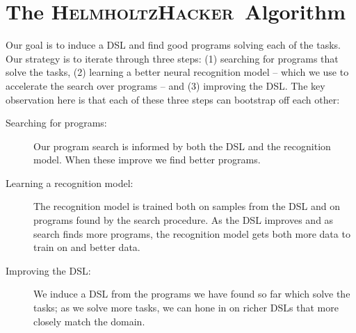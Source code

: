 \documentclass{article}
\newcommand{\system}{\textsc{HelmholtzHacker}~}
\newcommand{\probability}{\mathds{P}} %
\begin{document}



\section{The \system Algorithm}

Our goal  is to induce a DSL and find good programs solving each of the tasks.
Our strategy is to iterate through three steps: (1) searching for programs that
solve the tasks, (2) learning a better neural recognition model -- which we use
to accelerate the search over programs -- and (3) improving the DSL.
The key observation here is that each of these three steps can bootstrap off each other:

\begin{description}
\item[ Searching for programs:]  Our program search  is informed by both the DSL and the recognition model.
When these improve we find better programs.
  \item[ Learning a recognition model:] The recognition model is trained both on samples from the DSL and on programs found by the search procedure. As the DSL improves and as search finds more programs, the recognition model gets both more data to train on and better data.
  \item[Improving the DSL:] We induce a DSL from the programs we have found so far which solve the tasks;
  as we solve more tasks, we can hone in on richer DSLs that more closely match the domain.
\end{description}
\end{document}
